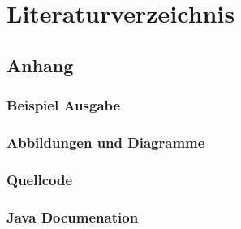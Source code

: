 \documentclass[]{article}
\begin{document}
\section{Literaturverzeichnis}
    \subsection{Anhang}
        \subsubsection{Beispiel Ausgabe}
        \subsubsection{Abbildungen und Diagramme}
        \subsubsection{Quellcode}
        \subsubsection{Java Documenation}
\end{document}
